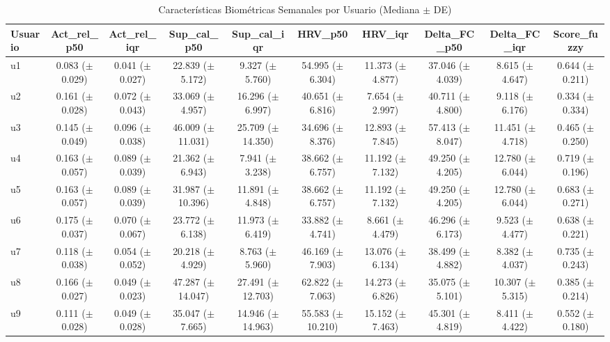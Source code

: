 \begin{landscape}
\begin{table}[p]
\centering
\caption{Características Biométricas Semanales por Usuario (Mediana $\pm$ DE)}
\label{tab:caracteristicas_usuario}
\tiny
\begin{tabular}{@{}lccccccccc@{}}
\toprule
\textbf{Usuario} & \textbf{Act\_rel\_p50} & \textbf{Act\_rel\_iqr} & \textbf{Sup\_cal\_p50} & \textbf{Sup\_cal\_iqr} & \textbf{HRV\_p50} & \textbf{HRV\_iqr} & \textbf{Delta\_FC\_p50} & \textbf{Delta\_FC\_iqr} & \textbf{Score\_fuzzy} \\
\midrule
u1  & 0.083 ($\pm$0.029) & 0.041 ($\pm$0.027) & 22.839 ($\pm$5.172)  & 9.327 ($\pm$5.760)   & 54.995 ($\pm$6.304) & 11.373 ($\pm$4.877) & 37.046 ($\pm$4.039) & 8.615 ($\pm$4.647)  & 0.644 ($\pm$0.211) \\
u2  & 0.161 ($\pm$0.028) & 0.072 ($\pm$0.043) & 33.069 ($\pm$4.957)  & 16.296 ($\pm$6.997)  & 40.651 ($\pm$6.816) & 7.654 ($\pm$2.997)  & 40.711 ($\pm$4.800) & 9.118 ($\pm$6.176)  & 0.334 ($\pm$0.334) \\
u3  & 0.145 ($\pm$0.049) & 0.096 ($\pm$0.038) & 46.009 ($\pm$11.031) & 25.709 ($\pm$14.350) & 34.696 ($\pm$8.376) & 12.893 ($\pm$7.845) & 57.413 ($\pm$8.047) & 11.451 ($\pm$4.718) & 0.465 ($\pm$0.250) \\
u4  & 0.163 ($\pm$0.057) & 0.089 ($\pm$0.039) & 21.362 ($\pm$6.943)  & 7.941 ($\pm$3.238)   & 38.662 ($\pm$6.757) & 11.192 ($\pm$7.132) & 49.250 ($\pm$4.205) & 12.780 ($\pm$6.044) & 0.719 ($\pm$0.196) \\
u5  & 0.163 ($\pm$0.057) & 0.089 ($\pm$0.039) & 31.987 ($\pm$10.396) & 11.891 ($\pm$4.848)  & 38.662 ($\pm$6.757) & 11.192 ($\pm$7.132) & 49.250 ($\pm$4.205) & 12.780 ($\pm$6.044) & 0.683 ($\pm$0.271) \\
u6  & 0.175 ($\pm$0.037) & 0.070 ($\pm$0.067) & 23.772 ($\pm$6.138)  & 11.973 ($\pm$6.419)  & 33.882 ($\pm$4.741) & 8.661 ($\pm$4.479)  & 46.296 ($\pm$6.173) & 9.523 ($\pm$4.477)  & 0.638 ($\pm$0.221) \\
u7  & 0.118 ($\pm$0.038) & 0.054 ($\pm$0.052) & 20.218 ($\pm$4.929)  & 8.763 ($\pm$5.960)   & 46.169 ($\pm$7.903) & 13.076 ($\pm$6.134) & 38.499 ($\pm$4.882) & 8.382 ($\pm$4.037)  & 0.735 ($\pm$0.243) \\
u8  & 0.166 ($\pm$0.027) & 0.049 ($\pm$0.023) & 47.287 ($\pm$14.047) & 27.491 ($\pm$12.703) & 62.822 ($\pm$7.063) & 14.273 ($\pm$6.826) & 35.075 ($\pm$5.101) & 10.307 ($\pm$5.315) & 0.385 ($\pm$0.214) \\
u9  & 0.111 ($\pm$0.028) & 0.049 ($\pm$0.028) & 35.047 ($\pm$7.665)  & 14.946 ($\pm$14.963) & 55.583 ($\pm$10.210) & 15.152 ($\pm$7.463) & 45.301 ($\pm$4.819) & 8.411 ($\pm$4.422) & 0.552 ($\pm$0.180) \\

\end{tabular}
\end{table}
\end{landscape}
